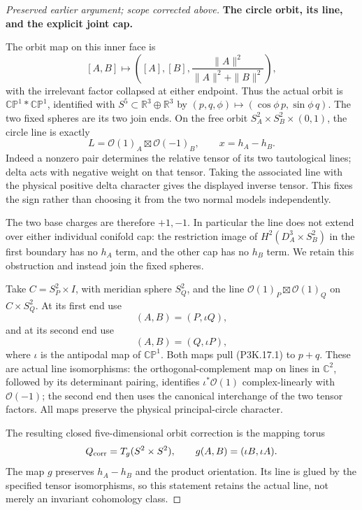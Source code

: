 \begin{proof}[Preserved earlier argument; scope corrected above]
\par\medskip\noindent\textbf{The circle orbit, its line, and the explicit joint cap.}\enspace

The orbit map on this inner face is
\[
 [A,B]\longmapsto
 \left([A],[B],\frac{\|A\|^2}{\|A\|^2+\|B\|^2}\right),
\]
with the irrelevant factor collapsed at either endpoint.
Thus the actual orbit is \(\mathbb {CP}^1*\mathbb {CP}^1\),
identified with \(S^5\subset\mathbb R^3\oplus\mathbb R^3\)
by \((p,q,\phi)\mapsto(\cos\phi\,p,\sin\phi\,q)\).
The two fixed spheres are its two join ends.  On the free orbit
\(S^2_A\times S^2_B\times(0,1)\), the circle line is exactly
\[
           L=\mathcal O(1)_A\boxtimes\mathcal O(-1)_B,
           \qquad x=h_A-h_B.                         \tag{P3K.17.1}
\]
Indeed a nonzero pair determines the relative tensor of its
two tautological lines; delta acts with negative weight on
that tensor.  Taking the associated line with the physical
positive delta character gives the displayed inverse tensor.
This fixes the sign rather than choosing it from the two
normal models independently.

The two base charges are therefore \(+1,-1\).  In particular
the line does not extend over either individual conifold cap:
the restriction image of
\(H^2(D^3_A\times S^2_B)\) in the first boundary has no
\(h_A\) term, and the other cap has no \(h_B\) term.
We retain this obstruction and instead join the fixed spheres.

Take \(C=S^2_P\times I\), with meridian sphere \(S^2_Q\),
and the line \(\mathcal O(1)_P\boxtimes\mathcal O(1)_Q\)
on \(C\times S^2_Q\).  At its first end use
\[
              (A,B)=(P,\iota Q),
\]
and at its second end use
\[
              (A,B)=(Q,\iota P),                    \tag{P3K.17.2}
\]
where \(\iota\) is the antipodal map of \(\mathbb {CP}^1\).
Both maps pull (P3K.17.1) to \(p+q\).  These are actual
line isomorphisms: the orthogonal-complement map on lines in
\(\mathbb C^2\), followed by its determinant pairing,
identifies \(\iota^*\mathcal O(1)\) complex-linearly with
\(\mathcal O(-1)\); the second end then uses the canonical
interchange of the two tensor factors.  All maps preserve
the physical principal-circle character.

The resulting closed five-dimensional orbit correction is the
mapping torus
\[
 Q_{\rm corr}=T_g(S^2\times S^2),\qquad
           g(A,B)=(\iota B,\iota A).
\]
The map \(g\) preserves \(h_A-h_B\) and the product
orientation.  Its line is glued by the specified tensor
isomorphisms, so this statement retains the actual line,
not merely an invariant cohomology class.


\end{proof}
